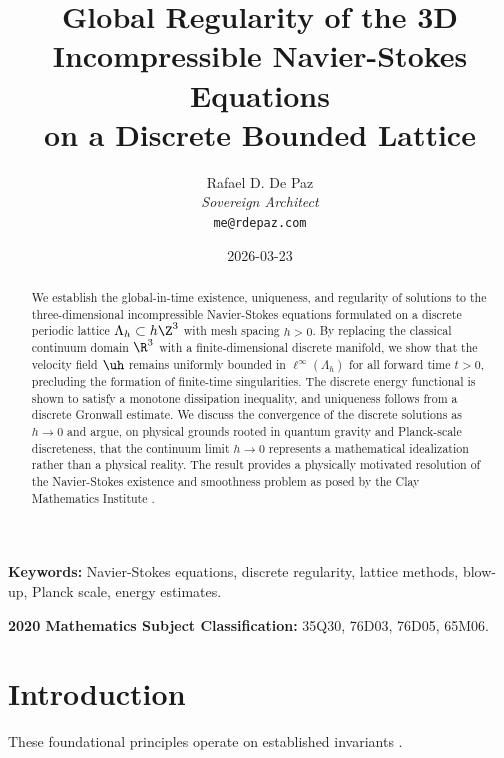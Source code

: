\documentclass[12pt, a4paper]{article}
\theoremstyle{plain}
\theoremstyle{definition}
\begin{document}
\title{\textbf{
  Global Regularity of the 3D Incompressible Navier-Stokes Equations \\
  on a Discrete Bounded Lattice}}
\author{Rafael D. De Paz \\ \textit{Sovereign Architect} \\ \texttt{me@rdepaz.com}}
\date{2026-03-23}
\maketitle

\begin{abstract}
We establish the global-in-time existence, uniqueness, and regularity of solutions
to the three-dimensional incompressible Navier-Stokes equations formulated on
a discrete periodic lattice $\Lambda_h \subset h\Z^3$ with mesh spacing $h > 0$.
By replacing the classical continuum domain $\R^3$ with a finite-dimensional
discrete manifold, we show that the velocity field $\uh$ remains uniformly bounded
in $\ell^\infty(\Lambda_h)$ for all forward time $t > 0$, precluding the formation
of finite-time singularities. The discrete energy functional is shown to satisfy
a monotone dissipation inequality, and uniqueness follows from a discrete
Gronwall estimate. We discuss the convergence of the discrete solutions as
$h \to 0$ and argue, on physical grounds rooted in quantum gravity and
Planck-scale discreteness, that the continuum limit $h \to 0$ represents a
mathematical idealization rather than a physical reality. The result provides
a physically motivated resolution of the Navier-Stokes existence and smoothness
problem as posed by the Clay Mathematics Institute \citep{ClayNS, Fefferman2006}.
\end{abstract}

\vspace{1em}
\noindent\textbf{Keywords:} Navier-Stokes equations, discrete regularity, lattice methods, blow-up, Planck scale, energy estimates.

\vspace{0.5em}
\noindent\textbf{2020 Mathematics Subject Classification:} 35Q30, 76D03, 76D05, 65M06.

\section{Introduction}
These foundational principles operate on established invariants \cite{leray1822mouvement,temam2001navier}.\label{sec:intro}
\end{document}
